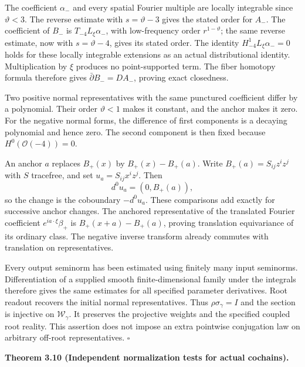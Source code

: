 \documentclass[
  english,
  11pt,
  reqno]{amsart}
\makeatletter
\newcommand{\pandocstatementheading}[1]{%
  \par\if@nobreak\else
    \addpenalty{\@beginparpenalty}%
    \addvspace{.5\baselineskip plus .2\baselineskip minus .2\baselineskip}%
  \fi
  {\normalfont\bfseries #1\par}%
  \nobreak\@afterindenttrue\@afterheading
}
\makeatother
\begin{document}
The coefficient \(\alpha_-\) and every spatial Fourier multiple are
locally integrable since \(\vartheta<3\). The reverse estimate with
\(s=\vartheta-3\) gives the stated order for \(A_-\). The coefficient of
\(B_-\) is \(T_{-4}L_\xi\alpha_-\), with low-frequency order
\(r^{1-\vartheta}\); the same reverse estimate, now with
\(s=\vartheta-4\), gives its stated order. The identity
\(H_{-4}^1L_\xi\alpha_-=0\) holds for these locally integrable
extensions as an actual distributional identity. Multiplication by
\(\xi\) produces no point-supported term. The fiber homotopy formula
therefore gives \(\bar\partial B_-=D A_-\), proving exact closedness.

Two positive normal representatives with the same punctured coefficient
differ by a polynomial. Their order \(\vartheta<1\) makes it constant,
and the anchor makes it zero. For the negative normal forms, the
difference of first components is a decaying polynomial and hence zero.
The second component is then fixed because \(H^0(\mathcal O(-4))=0\).

An anchor \(a\) replaces \(B_+(x)\) by \(B_+(x)-B_+(a)\). Write
\(B_+(a)=S_{ij}z^iz^j\) with \(S\) tracefree, and set
\(u_a=S_{ij}x^iz^j\). Then%
 \[
d^0u_a=(0,B_+(a)),
\] so the change is the coboundary \(-d^0u_a\). These comparisons add
exactly for successive anchor changes. The anchored representative of
the translated Fourier coefficient \(e^{ia\cdot\xi}\beta_+\) is
\(B_+(x+a)-B_+(a)\), proving translation equivariance of its ordinary
class. The negative inverse transform already commutes with translation
on representatives.

Every output seminorm has been estimated using finitely many input
seminorms. Differentiation of a supplied smooth finite-dimensional
family under the integrals therefore gives the same estimates for all
specified parameter derivatives. Root readout recovers the initial
normal representatives. Thus \(\rho\sigma_\gamma=I\) and the section is
injective on \(\mathscr W_\gamma\). It preserves the projective weights
and the specified coupled root reality. This assertion does not impose
an extra pointwise conjugation law on arbitrary off-root
representatives. \hfill\(\square\)

\pandocstatementheading{\leavevmode{}\label{thm:online-actual-cochain-obstruction-test}Theorem 3.10 (Independent normalization tests for actual cochains).}
\end{document}
